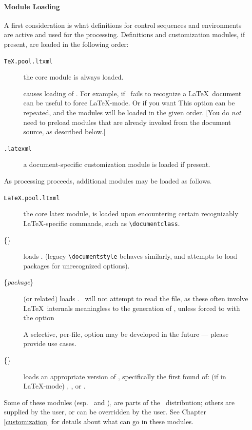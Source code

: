 \documentclass{book}
\begin{document}
\paragraph{Module Loading}\label{usage.conversion.loading}
A first consideration is what definitions for control sequences and
environments are active and used for the processing.
Definitions and customization modules, if present, are loaded in the following
order:
\begin{description}
  \item[\texttt{TeX.pool.ltxml}] the core module is always loaded.
  \item[] causes loading of .
    For example, if \LaTeXML\ fails to recognize a \LaTeX\ document 
     can be useful to force \LaTeX-mode.
    Or if you want
    This option can be repeated, and the modules will be loaded in the
    given order.
    [You do \emph{not} need to preload modules that are already invoked from
    the document source, as described below.]
  \item[\texttt{.latexml}] a document-specific customization module
    is loaded if present.
\end{description}
As processing proceeds, additional modules may be loaded as follows.
\begin{description}
  \item[\texttt{LaTeX.pool.ltxml}] the core latex module, is loaded
    upon encountering certain recognizably \LaTeX-specific commands, such as
    \verb|\documentclass|.
  \item[\{\textnormal\}]
     loads .
     (legacy \verb|\documentstyle| behaves similarly, and attempts to load packages for
      unrecognized options).
  \item[\{\textit{package}\}] (or related) loads
    .  \LaTeXML\ will not
    attempt to read the  file, as these
    often involve \LaTeX\ internals meaningless to the generation of \XML,
    unless forced to with the option
    \begin{quote}
    \end{quote}
    A selective, per-file, option may be developed in the future --- please
    provide use cases.
  \item[\{\}] loads an appropriate version
     of , specifically the first found of:
     (if in \LaTeX-mode)
    , , 
     or .
\end{description}
Some of these modules (esp.~ and ), are parts of
the \LaTeXML\ distribution; others are supplied by the user, or can be
overridden by the user.
See Chapter \ref{customization} for details about what can go in these modules.
\end{document}
